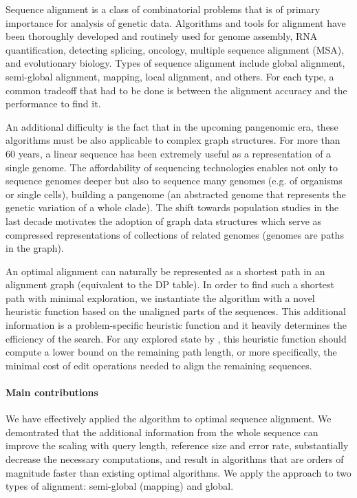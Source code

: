 
Sequence alignment is a class of combinatorial problems that is of primary
importance for analysis of genetic data. Algorithms and tools for alignment have
been thoroughly developed and routinely used for genome assembly, RNA
quantification, detecting splicing, oncology, multiple sequence alignment (MSA),
and evolutionary biology. Types of sequence alignment include global alignment,
semi-global alignment, mapping, local alignment, and others. For each type, a
common tradeoff that had to be done is between the alignment accuracy and the
performance to find it.

An additional difficulty is the fact that in the
upcoming pangenomic era, these algorithms must be also applicable to complex
graph structures. For more than 60 years, a linear sequence has been extremely
useful as a representation of a single genome. The affordability of sequencing
technologies enables not only to sequence genomes deeper but also to sequence
many genomes (e.g. of organisms or single cells), building a pangenome (an
abstracted genome that represents the genetic variation of a whole clade). The
shift towards population studies in the last decade motivates the adoption of
graph data structures which serve as compressed representations of collections
of related genomes (genomes are paths in the graph).

An optimal alignment can naturally be represented as a shortest path in an
alignment graph (equivalent to the DP table). In order to find such a shortest
path with minimal exploration, we instantiate the \A algorithm with a novel
heuristic function based on the unaligned parts of the sequences. This
additional information is a problem-specific heuristic function and it heavily
determines the efficiency of the search. For any explored state by \A, this
heuristic function should compute a lower bound on the remaining path length, or
more specifically, the minimal cost of edit operations needed to align the
remaining sequences.

\paragraph{Main contributions}
We have effectively applied the \A algorithm to optimal sequence alignment. We
demontrated that the additional information from the whole sequence can improve
the scaling with query length, reference size and error rate, substantially
decrease the necessary computations, and result in algorithms that are orders of
magnitude faster than existing optimal algorithms. We apply the \A approach to
two types of alignment: semi-global (mapping) and global.


